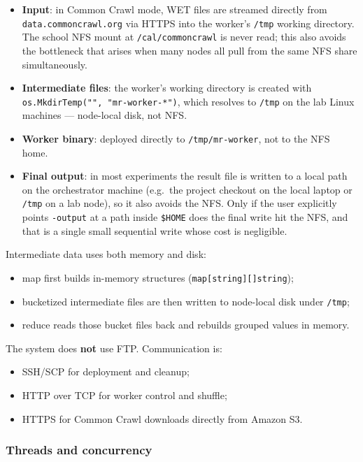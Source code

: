 \documentclass[11pt,a4paper]{article}
\begin{document}
\begin{itemize}[leftmargin=1.5em]
  \item \textbf{Input}: in Common Crawl mode, WET files are streamed directly
  from \texttt{data.commoncrawl.org} via HTTPS into the worker's \texttt{/tmp}
  working directory. The school NFS mount at \texttt{/cal/commoncrawl} is never
  read; this also avoids the bottleneck that arises when many nodes all pull from
  the same NFS share simultaneously.
  \item \textbf{Intermediate files}: the worker's working directory is created
  with \texttt{os.MkdirTemp("", "mr-worker-*")}, which resolves to
  \texttt{/tmp} on the lab Linux machines — node-local disk, not NFS.
  \item \textbf{Worker binary}: deployed directly to \texttt{/tmp/mr-worker},
  not to the NFS home.
  \item \textbf{Final output}: in most experiments the result file is written to
  a local path on the orchestrator machine (e.g.\ the project checkout on the
  local laptop or \texttt{/tmp} on a lab node), so it also avoids the NFS.
  Only if the user explicitly points \texttt{-output} at a path inside
  \texttt{\$HOME} does the final write hit the NFS, and that is a single small
  sequential write whose cost is negligible.
\end{itemize}

Intermediate data uses both memory and disk:
\begin{itemize}[leftmargin=1.5em]
  \item map first builds in-memory structures
  (\texttt{map[string][]string});
  \item bucketized intermediate files are then written to node-local disk under
  \texttt{/tmp};
  \item reduce reads those bucket files back and rebuilds grouped values in
  memory.
\end{itemize}

The system does \textbf{not} use FTP. Communication is:
\begin{itemize}[leftmargin=1.5em]
  \item SSH/SCP for deployment and cleanup;
  \item HTTP over TCP for worker control and shuffle;
  \item HTTPS for Common Crawl downloads directly from Amazon S3.
\end{itemize}

\subsubsection{Threads and concurrency}
\end{document}
